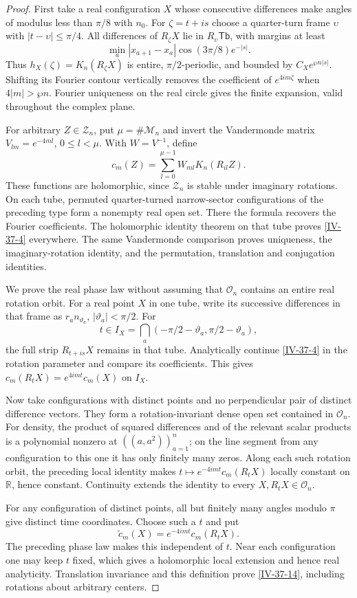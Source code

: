 \documentclass[11pt,letterpaper,reqno]{amsart}
\theoremstyle{definition}
\theoremstyle{remark}
\begin{document}
\begin{proof}
First take a real configuration $X$ whose consecutive
differences make angles of modulus less than $\pi/8$
with $n_0$. For $\zeta=t+is$ choose a quarter-turn
frame $\upsilon$ with $|t-\upsilon|\le\pi/4$.
All differences of $R_\zeta X$ lie in
$R_\upsilon\mathsf{Tb}$, with margins at least
\[
 \min_a|x_{a+1}-x_a|\cos(3\pi/8)e^{-|s|}.
\]
Thus $h_X(\zeta)=K_n(R_\zeta X)$ is entire,
$\pi/2$-periodic, and bounded by $C_Xe^{\wp n|s|}$.
Shifting its Fourier contour vertically removes the
coefficient of $e^{4im\zeta}$ when $4|m|>\wp n$.
Fourier uniqueness on the real circle gives the finite
expansion, valid throughout the complex plane.

For arbitrary $Z\in\mathcal Z_n$, put
$\mu=\#\mathcal M_n$ and invert the Vandermonde matrix
$V_{lm}=e^{-4ml}$, $0\le l<\mu$. With $W=V^{-1}$,
define
\[
 c_m(Z)=\sum_{l=0}^{\mu-1}W_{ml}K_n(R_{il}Z).
\]
These functions are holomorphic, since $\mathcal Z_n$
is stable under imaginary rotations. On each tube,
permuted quarter-turned narrow-sector configurations
of the preceding type form a nonempty real open set.
There the formula recovers the Fourier coefficients.
The holomorphic identity theorem on that tube proves
\eqref{IV-37-4} everywhere. The same Vandermonde
comparison proves uniqueness, the imaginary-rotation
identity, and the permutation, translation and
conjugation identities.

We prove the real phase law without assuming that
$\mathcal O_n$ contains an entire real rotation orbit.
For a real point $X$ in one tube, write its successive
differences in that frame as $r_an_{\vartheta_a}$,
$|\vartheta_a|<\pi/2$. For
\[
 t\in I_X=\bigcap_a(-\pi/2-\vartheta_a,\pi/2-\vartheta_a),
\]
the full strip $R_{t+is}X$ remains in that tube.
Analytically continue \eqref{IV-37-4} in the rotation
parameter and compare its coefficients. This gives
$c_m(R_tX)=e^{4imt}c_m(X)$ on $I_X$.

Now take configurations with distinct points and no
perpendicular pair of distinct difference vectors.
They form a rotation-invariant dense open set contained
in $\mathcal O_n$. For density, the product of squared
differences and of the relevant scalar products is a
polynomial nonzero at $((a,a^2))_{a=1}^n$; on the line
segment from any configuration to this one it has only
finitely many zeros. Along each such rotation orbit,
the preceding local identity makes
$t\mapsto e^{-4imt}c_m(R_tX)$ locally constant on
$\mathbb R$, hence constant. Continuity extends the
identity to every $X,R_tX\in\mathcal O_n$.

For any configuration of distinct points, all but
finitely many angles modulo $\pi$ give distinct time
coordinates. Choose such a $t$ and put
\[
 \widetilde c_m(X)=e^{-4imt}c_m(R_tX).
\]
The preceding phase law makes this independent of
$t$. Near each configuration one may keep $t$ fixed,
which gives a holomorphic local extension and hence
real analyticity. Translation invariance and this
definition prove \eqref{IV-37-14}, including rotations
about arbitrary centers.
\end{proof}
\end{document}
